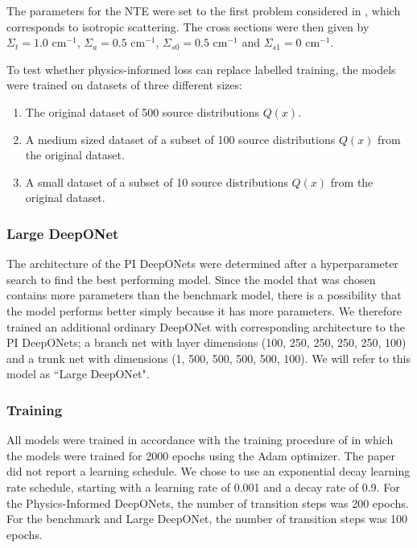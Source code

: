 \documentclass[%
 reprint,
 amsmath,amssymb,
 aps,
]{revtex4-1}
\begin{document}
The parameters for the NTE were set to the first problem considered in \cite{sahadath2026characterization}, which corresponds to isotropic
scattering. The cross sections were then given by
$\Sigma_t = 1.0 \text{ cm}^{-1}$, $\Sigma_a = 0.5 \text{ cm}^{-1}$, $\Sigma_{s0} = 0.5 \text{ cm}^{-1}$ and $\Sigma_{s1} = 0 \text{ cm}^{-1}$.

To test whether physics-informed loss can replace labelled training, the models were trained on datasets of three different sizes:
\begin{enumerate}
    \item The original dataset of 500 source distributions $Q(x)$.
    \item A medium sized dataset of a subset of 100 source distributions $Q(x)$ from the original dataset.
    \item A small dataset of a subset of 10 source distributions $Q(x)$ from the original dataset.
\end{enumerate}

\subsubsection{Large DeepONet}

The architecture of the PI DeepONets were determined after a hyperparameter search to find the best performing model. Since the model that was chosen
contains more parameters than the benchmark model, there is a possibility that the model performs better simply because it has more parameters. We
therefore trained an additional ordinary DeepONet with corresponding architecture to the PI DeepONets; a branch net with layer dimensions
(100, 250, 250, 250, 250, 100) and a trunk net with dimensions (1, 500, 500, 500, 500, 100). We will refer to this model as “Large DeepONet".

\subsubsection{Training}

All models were trained in accordance with the training procedure of \cite{sahadath2026characterization} in which the models were trained for 2000 epochs using
the Adam optimizer. The paper did not report a learning schedule. We chose to use an exponential decay learning rate schedule, starting with a learning
rate of 0.001 and a decay rate of 0.9. For the Physics-Informed DeepONets, the number of transition steps was 200 epochs. For the benchmark and Large
DeepONet, the number of transition steps was 100 epochs.
\end{document}
